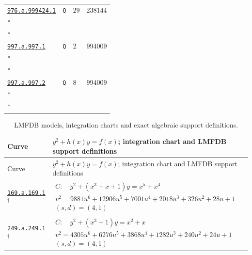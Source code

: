 \documentclass[10pt]{article}
\newcommand{\entryseparator}{\noalign{\vskip3pt\hbox to\linewidth{\leaders\hbox{\kern2pt\rule{3pt}{0.3pt}\kern2pt}\hfill}\nobreak\vskip3pt\nobreak}}
\begin{document}
\begin{landscape}
\begin{longtable}{@{}p{.4\linewidth}>{\centering\arraybackslash}p{.2\linewidth}>{\raggedleft\arraybackslash}p{.16\linewidth}>{\raggedleft\arraybackslash}p{}@{}}
\entryseparator
\href{https://www.lmfdb.org/Genus2Curve/Q/976/a/999424/1}{\texttt{976.a.999424.1}} & \texttt{Q} & $29$ & $238144$ \\*
\multicolumn{4}{@{}l@{}}{$D_{1}=66\,\left(-1,0\right)-49\,\left(1,-2\right)+16\,\infty_{Y=-1}-49\,\left(1,0\right)+16\,\infty_{Y=1}$} \\*
\multicolumn{4}{@{}l@{}}{$D_{2}=33\,\left(0,-1\right)+33\,\left(0,0\right)-13\,\left(1,-2\right)-20\,\infty_{Y=-1}-13\,\left(1,0\right)-20\,\infty_{Y=1}$} \\
\entryseparator
\href{https://www.lmfdb.org/Genus2Curve/Q/997/a/997/1}{\texttt{997.a.997.1}} & \texttt{Q} & $2$ & $994009$ \\*
\multicolumn{4}{@{}l@{}}{$D_{1}=\left(0,0\right)-\left(4,-2\right)$} \\*
\multicolumn{4}{@{}l@{}}{$D_{2}=\infty_{Y=0}-\left(4,-2\right)$} \\
\entryseparator
\href{https://www.lmfdb.org/Genus2Curve/Q/997/a/997/2}{\texttt{997.a.997.2}} & \texttt{Q} & $8$ & $994009$ \\*
\multicolumn{4}{@{}l@{}}{$D_{1}=\left(-1,0\right)-\infty_{Y=0}$} \\*
\multicolumn{4}{@{}l@{}}{$D_{2}=\left(0,-1\right)+\left(0,0\right)-2\,\infty_{Y=0}$} \\
\end{longtable}
\clearpage
\begin{longtable}{@{}p{3.4cm}p{\dimexpr\linewidth-3.4cm-2\tabcolsep\relax}@{}}
\caption{LMFDB models, integration charts and exact algebraic support definitions.}\label{tab:curve-models}\\
\toprule Curve & $y^2+h(x)y=f(x)$; integration chart and LMFDB support definitions \\ \midrule\endfirsthead
\toprule Curve & $y^2+h(x)y=f(x)$; integration chart and LMFDB support definitions \\ \midrule\endhead
\bottomrule\endfoot
\href{https://www.lmfdb.org/Genus2Curve/Q/169/a/169/1}{\texttt{169.a.169.1}}$^{\dagger}$ & $\begin{gathered}C:\quad y^2+\left(x^{3} + x + 1\right)y=x^{5} + x^{4}\\v^2=9881 u^{6} + 12906 u^{5} + 7001 u^{4} + 2018 u^{3} + 326 u^{2} + 28 u + 1\\(s,d)=(4,1)\end{gathered}$ \\
\entryseparator
\href{https://www.lmfdb.org/Genus2Curve/Q/249/a/249/1}{\texttt{249.a.249.1}}$^{\dagger}$ & $\begin{gathered}C:\quad y^2+\left(x^{3} + 1\right)y=x^{2} + x\\v^2=4305 u^{6} + 6276 u^{5} + 3868 u^{4} + 1282 u^{3} + 240 u^{2} + 24 u + 1\\(s,d)=(4,1)\end{gathered}$ \\

\end{longtable}
\end{landscape}
\end{document}
